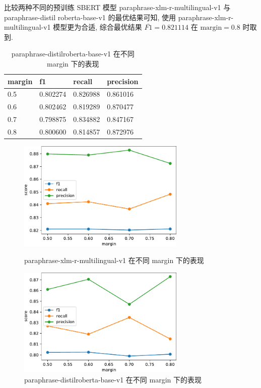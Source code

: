 \documentclass[12pt]{article}
\begin{document}
比较两种不同的预训练 SBERT 模型 paraphrase-xlm-r-multilingual-v1 与 paraphrase-distil roberta-base-v1 的最优结果可知, 使用 paraphrase-xlm-r-multilingual-v1 模型更为合适, 综合最优结果 $\overline{F1}=0.821114$ 在 $\text{margin} = 0.8$ 时取到.

\begin{table}[htbp]
  \centering
  \caption{paraphrase-distilroberta-base-v1 在不同 margin 下的表现}
  \label{tab:sbert_distilroberta_hp}
  \begin{tabular}{llll}
    \toprule
    margin & f1       & recall   & precision \\
    \midrule
    0.5 & 0.802274 & 0.826988 & 0.861016  \\
    0.6 & 0.802462 & 0.819289 & 0.870477  \\
    0.7 & 0.798875 & 0.834882 & 0.847167  \\
    0.8 & 0.800600 & 0.814857 & 0.872976  \\
    \bottomrule
  \end{tabular}
\end{table}

\begin{figure}[htbp]
  \centering
  \begin{minipage}[t]{0.48\textwidth}
    \centering
    \includegraphics[width=8cm]{sbert_xlm_r_hp.pdf}
    \caption{paraphrase-xlm-r-multilingual-v1 在不同 margin 下的表现}
    \label{fig:sbert_xlm_r_hp}
  \end{minipage}
  \begin{minipage}[t]{0.48\textwidth}
    \centering
    \includegraphics[width=8cm]{sbert_distilroberta_hp.pdf}
    \caption{paraphrase-distilroberta-base-v1 在不同 margin 下的表现}
    \label{fig:sbert_distilroberta_hp}
  \end{minipage}
\end{figure}
\end{document}
